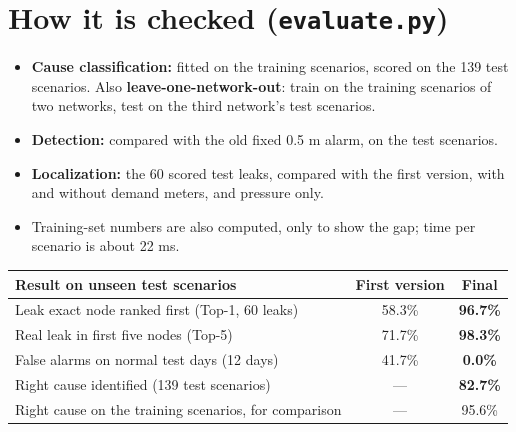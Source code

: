 \documentclass[11pt,a4paper]{article}
\newcommand{\code}[1]{\texttt{#1}}
\begin{document}
\section{How it is checked (\code{evaluate.py})}
\begin{itemize}[itemsep=2pt]
\item \textbf{Cause classification:} fitted on the training scenarios, scored on the 139 test scenarios. Also \textbf{leave-one-network-out}: train on the training scenarios of two networks, test on the third network's test scenarios.
\item \textbf{Detection:} compared with the old fixed 0.5 m alarm, on the test scenarios.
\item \textbf{Localization:} the 60 scored test leaks, compared with the first version, with and without demand meters, and pressure only.
\item Training-set numbers are also computed, only to show the gap; time per scenario is about 22 ms.
\end{itemize}
\begin{center}\small\begin{tabular}{@{}lcc@{}}\toprule
Result on unseen test scenarios & First version & Final \\\midrule
Leak exact node ranked first (Top-1, 60 leaks) & 58.3\% & \textbf{96.7\%} \\
Real leak in first five nodes (Top-5) & 71.7\% & \textbf{98.3\%} \\
False alarms on normal test days (12 days) & 41.7\% & \textbf{0.0\%} \\
Right cause identified (139 test scenarios) & --- & \textbf{82.7\%} \\
Right cause on the training scenarios, for comparison & --- & 95.6\% \\\bottomrule\end{tabular}\end{center}
\end{document}
